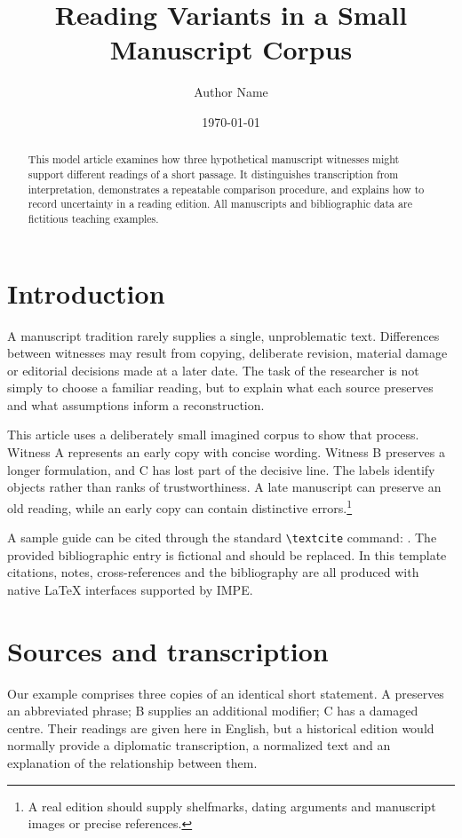 \documentclass{impeart}
\title{Reading Variants in a Small Manuscript Corpus}
\author{Author Name}
\date{\today}
\begin{document}
\maketitle
\begin{abstract}
This model article examines how three hypothetical manuscript witnesses
might support different readings of a short passage. It distinguishes
transcription from interpretation, demonstrates a repeatable comparison
procedure, and explains how to record uncertainty in a reading edition.
All manuscripts and bibliographic data are fictitious teaching examples.
\end{abstract}

\section{Introduction}\label{sec:intro}
A manuscript tradition rarely supplies a single, unproblematic text.
Differences between witnesses may result from copying, deliberate revision,
material damage or editorial decisions made at a later date. The task of
the researcher is not simply to choose a familiar reading, but to explain
what each source preserves and what assumptions inform a reconstruction.

This article uses a deliberately small imagined corpus to show that process.
Witness A represents an early copy with concise wording. Witness B preserves
a longer formulation, and C has lost part of the decisive line. The labels
identify objects rather than ranks of trustworthiness. A late manuscript
can preserve an old reading, while an early copy can contain distinctive
errors.\footnote{A real edition should supply shelfmarks, dating arguments
and manuscript images or precise references.}

A sample guide can be cited through the standard \verb|\textcite|
command: \textcite{sample2026}. The provided bibliographic entry is
fictional and should be replaced. In this template citations, notes,
cross-references and the bibliography are all produced with native
\LaTeX{} interfaces supported by IMPE.

\section{Sources and transcription}\label{sec:sources}
Our example comprises three copies of an identical short statement.
A preserves an abbreviated phrase; B supplies an additional modifier;
C has a damaged centre. Their readings are given here in English,
but a historical edition would normally provide a diplomatic
transcription, a normalized text and an explanation of the relationship
between them.
\end{document}
